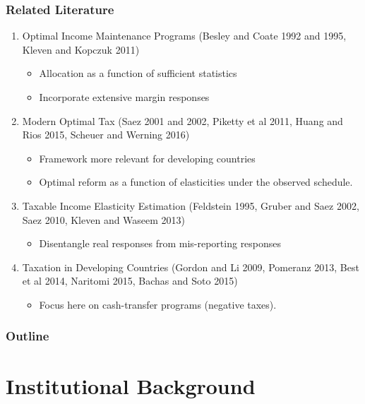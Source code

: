 \documentclass[xcolor=pdftex,dvipsnames,table]{beamer}
\begin{document}
\begin{frame}[label=literature]
 \frametitle{Related Literature}
\begin{enumerate}
\item Optimal Income Maintenance Programs (Besley and Coate 1992 and 1995, Kleven and Kopczuk 2011)
\begin{itemize}
\item Allocation as a function of sufficient statistics
\item Incorporate extensive margin responses
\end{itemize}
\pause
\item Modern Optimal Tax (Saez 2001 and 2002,  Piketty et al 2011, Huang and Rios 2015, Scheuer and Werning 2016)
\begin{itemize}
\item Framework more relevant for developing countries 
\item Optimal reform as a function of elasticities under the observed schedule.
\end{itemize}
\pause
\item Taxable Income Elasticity Estimation (Feldstein 1995, Gruber and Saez 2002, Saez 2010, Kleven and Waseem 2013)
\begin{itemize}
\item Disentangle real responses from mis-reporting responses
\end{itemize}
\pause
\item Taxation in Developing Countries (Gordon and Li 2009, Pomeranz 2013, Best et al 2014, Naritomi 2015, Bachas and Soto 2015)
\begin{itemize}
\item Focus here on cash-transfer programs (negative taxes).
\end{itemize}
\end{enumerate}
\end{frame}

\begin{frame}
    \frametitle{Outline}
    \tableofcontents[pausesections]
\end{frame}

\section{Institutional Background}
\end{document}
